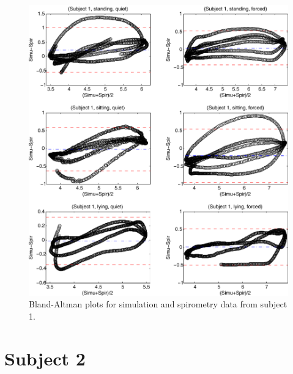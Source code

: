 \begin{figure}[H]
	\centering
	 \includegraphics[width=1\textwidth]{pics/ba_p1_det}
	\caption[Bland-Altman plots for simulation and spirometry data from subject 1]{\label{appB:fig:p1}Bland-Altman plots for simulation and spirometry data from subject 1.}
\end{figure}

\newpage
\section{\label{appendixB:p2}Subject 2}

